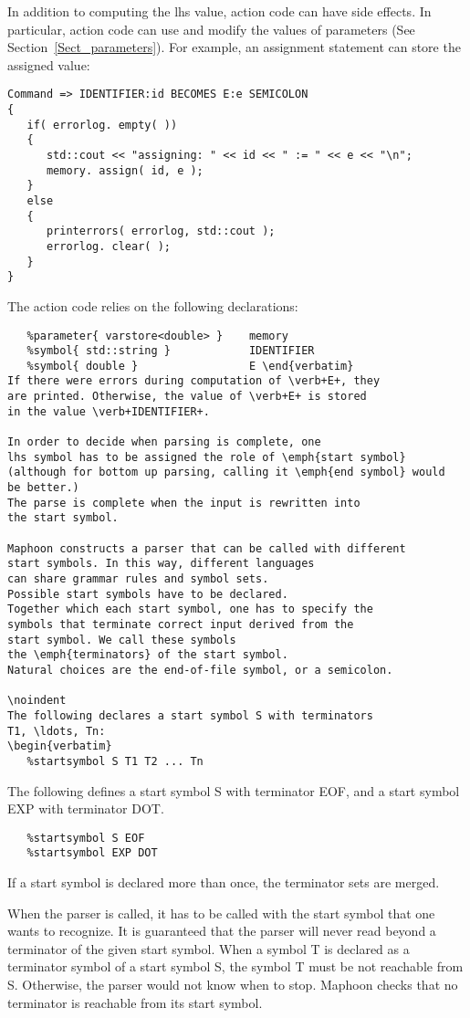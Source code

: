 \documentclass{article}
\begin{document}
In addition to computing the lhs value, action code can have
side effects. In particular, action code can use and modify 
the values of parameters (See Section~\ref{Sect_parameters}).
For example, an assignment statement can store 
the assigned value: 
\begin{verbatim}
Command => IDENTIFIER:id BECOMES E:e SEMICOLON 
{
   if( errorlog. empty( ))
   {
      std::cout << "assigning: " << id << " := " << e << "\n";
      memory. assign( id, e );
   }
   else
   {
      printerrors( errorlog, std::cout );
      errorlog. clear( );
   }
} \end{verbatim}
The action code relies on the following declarations:
\begin{verbatim}
   %parameter{ varstore<double> }    memory
   %symbol{ std::string }            IDENTIFIER
   %symbol{ double }                 E \end{verbatim}
If there were errors during computation of \verb+E+, they 
are printed. Otherwise, the value of \verb+E+ is stored
in the value \verb+IDENTIFIER+.

In order to decide when parsing is complete, one 
lhs symbol has to be assigned the role of \emph{start symbol}
(although for bottom up parsing, calling it \emph{end symbol} would
be better.)
The parse is complete when the input is rewritten into 
the start symbol. 

Maphoon constructs a parser that can be called with different
start symbols. In this way, different languages
can share grammar rules and symbol sets.
Possible start symbols have to be declared. 
Together which each start symbol, one has to specify the 
symbols that terminate correct input derived from the
start symbol. We call these symbols
the \emph{terminators} of the start symbol.
Natural choices are the end-of-file symbol, or a semicolon.

\noindent
The following declares a start symbol S with terminators
T1, \ldots, Tn:
\begin{verbatim}
   %startsymbol S T1 T2 ... Tn  
\end{verbatim}
The following defines a start symbol S with terminator
EOF, and a start symbol EXP with terminator DOT.
\begin{verbatim}
   %startsymbol S EOF
   %startsymbol EXP DOT
\end{verbatim}
If a start symbol is declared more than once, the terminator
sets are merged. 

When the parser is called, it has to be called with
the start symbol that one wants to recognize. 
It is guaranteed that the parser will never read beyond
a terminator of the given start symbol. 
When a symbol T is declared as a terminator symbol of a start
symbol S, the symbol T must be not reachable from S. 
Otherwise, the parser would not know when to stop.
Maphoon checks that no terminator is reachable from its
start symbol. 
\end{document}
